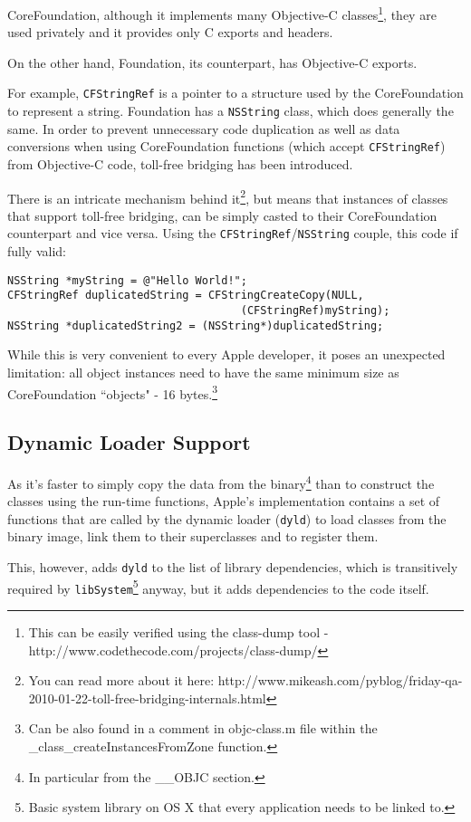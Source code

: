 CoreFoundation, although it implements many Objective-C classes\footnote{This can be easily verified using the class-dump tool - http://www.codethecode.com/projects/class-dump/}, they are used privately and it provides only C exports and headers.

On the other hand, Foundation, its counterpart, has Objective-C exports.

For example, \verb=CFStringRef= is a pointer to a structure used by the CoreFoundation to represent a string. Foundation has a \verb=NSString= class, which does generally the same. In order to prevent unnecessary code duplication as well as data conversions when using CoreFoundation functions (which accept \verb=CFStringRef=) from Objective-C code, toll-free bridging has been introduced.

There is an intricate mechanism behind it\footnote{You can read more about it here: http://www.mikeash.com/pyblog/friday-qa-2010-01-22-toll-free-bridging-internals.html}, but means that instances of classes that support toll-free bridging, can be simply casted to their CoreFoundation counterpart and vice versa. Using the \verb=CFStringRef=/\verb=NSString= couple, this code if fully valid:

\begin{verbatim}
NSString *myString = @"Hello World!";
CFStringRef duplicatedString = CFStringCreateCopy(NULL, 
                                    (CFStringRef)myString);
NSString *duplicatedString2 = (NSString*)duplicatedString;
\end{verbatim}

While this is very convenient to every Apple developer, it poses an unexpected limitation: all object instances need to have the same minimum size as CoreFoundation ``objects" - 16 bytes.\footnote{Can be also found in a comment in objc-class.m file within the \_class\_createInstancesFromZone function.}

\subsection{Dynamic Loader Support}
As it's faster to simply copy the data from the binary\footnote{In particular from the \_\_OBJC section.} than to construct the classes using the run-time functions, Apple's implementation contains a set of functions that are called by the dynamic loader (\verb=dyld=) to load classes from the binary image, link them to their superclasses and to register them.

This, however, adds \verb=dyld= to the list of library dependencies, which is transitively required by \verb=libSystem=\footnote{Basic system library on OS X that every application needs to be linked to.} anyway, but it adds dependencies to the code itself.

